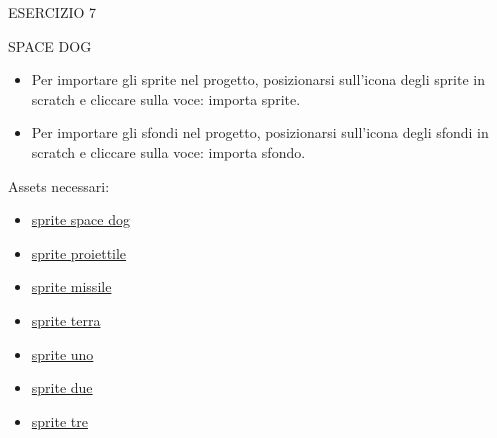 \documentclass[aspectratio=1610]{beamer}
\begin{document}
\begin{frame}{ESERCIZIO 7}
    \begin{alertblock}{SPACE DOG}
        \begin{minipage}{0.96\linewidth}
            \begin{itemize}
                \justifying
                    \item Per importare gli sprite nel progetto, posizionarsi sull'icona degli sprite in scratch e cliccare sulla voce: importa sprite.
                    \item Per importare gli sfondi nel progetto, posizionarsi sull'icona degli sfondi in scratch e cliccare sulla voce: importa sfondo.
            \end{itemize}
            Assets necessari:
            \begin{itemize}
                \justifying
                \item \href{assets/esercizio7/spaceDog.sprite3}{sprite space dog}
                \item \href{assets/esercizio7/proiettile.sprite3}{sprite proiettile}
                \item \href{assets/esercizio7/missile.sprite3}{sprite missile}
                \item \href{assets/esercizio7/terra.sprite3}{sprite terra}
                \item \href{assets/esercizio7/uno.sprite3}{sprite uno}
                \item \href{assets/esercizio7/due.sprite3}{sprite due}
                \item \href{assets/esercizio7/tre.sprite3}{sprite tre}
            \end{itemize}
        \end{minipage}
    \end{alertblock}
\end{frame}
\end{document}
